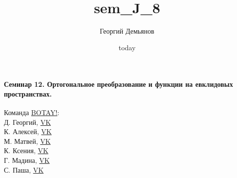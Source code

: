 \documentclass[a4paper,12pt]{article}
\title{sem_J_8}
\author{Георгий Демьянов}
\date{today}
\begin{document}
\paragraph{{\LARGE Семинар 12. Ортогональное преобразование и функции на евклидовых пространствах.}}














\begin{center}
	\vfill {\small 
			Команда \href{https://vk.com/botay_fizteh}{BOTAY!}:\\
			Д. Георгий, \href{https://vk.com/id37346992}{VK}\\
			К. Алексей, \href{https://vk.com/id92540660}{VK}\\
			М. Матвей, \href{https://vk.com/id62009425}{VK}\\
			К. Ксения, \href{https://vk.com/id143862366}{VK}\\
			Г. Мадина, \href{https://vk.com/id226312463}{VK}\\
			С. Паша, \href{https://vk.com/id181006282}{VK}\\
	}
\end{center}
\end{document}
